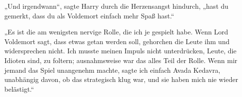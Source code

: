 „Und irgendwann“, sagte Harry durch die Herzensangst hindurch, „hast du gemerkt, dass du als Voldemort einfach mehr Spaß hast.“

„Es ist die am wenigsten nervige Rolle, die ich je gespielt habe. Wenn Lord Voldemort sagt, dass etwas getan werden soll, gehorchen die Leute ihm und widersprechen nicht. Ich musste meinen Impuls nicht unterdrücken, Leute, die Idioten sind, zu foltern; ausnahmsweise war das alles Teil der Rolle. Wenn mir jemand das Spiel unangenehm machte, sagte ich einfach Avada Kedavra, unabhängig davon, ob das strategisch klug war, und sie haben mich nie wieder belästigt.“
